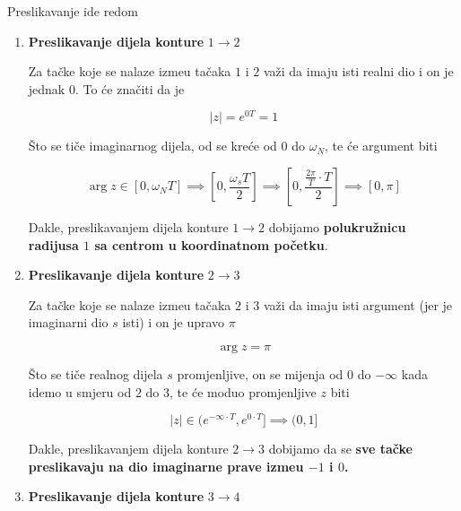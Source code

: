 \documentclass[12pt]{IEEEtran}
\numberwithin{equation}{subsection}
\numberwithin{figure}{section}
\begin{document}
Preslikavanje ide redom

\begin{enumerate}
    \item \textbf{Preslikavanje dijela konture} $1 \to 2$
    
    Za ta\v{c}ke koje se nalaze izme\dj{}u ta\v{c}aka $1$ i $2$ va\v{z}i 
    da imaju isti realni dio i on je jednak $0$. To \'{c}e zna\v{c}iti da je 

    \begin{equation}
        |z| = e^{0T} = 1
    \end{equation}

    \v{S}to se ti\v{c}e imaginarnog dijela, od se kre\'{c}e od $0$ do $\omega_{N}$, 
    te \'{c}e argument biti 

    \begin{equation}
        \arg{z} \in \left[0, \omega_{N}T\right] \implies \left[0, \frac{\omega_{s}T}{2}\right] \implies \left[0, \frac{\frac{2\pi}{T} \cdot T}{2}\right] \implies \left[0, \pi\right]
    \end{equation}

    Dakle, preslikavanjem dijela konture $1 \to 2$ dobijamo \textbf{polukru\v{z}nicu radijusa $1$ sa centrom u koordinatnom po\v{c}etku}.

    \newpage
    \item \textbf{Preslikavanje dijela konture} $2 \to 3$
    
    Za ta\v{c}ke koje se nalaze izme\dj{}u ta\v{c}aka $2$ i $3$ va\v{z}i da imaju 
    isti argument (jer je imaginarni dio $s$ isti) i on je upravo $\pi$

    \begin{equation}
        \arg{z} = \pi
    \end{equation}

    \v{S}to se ti\v{c}e realnog dijela $s$ promjenljive, on se mijenja od 0 do $-\infty$ kada idemo 
    u smjeru od $2$ do $3$, te \'{c}e moduo promjenljive $z$ biti

    \begin{equation}
        |z| \in (e^{-\infty \cdot T}, e^{0 \cdot T}] \implies (0, 1]
    \end{equation}

    Dakle, preslikavanjem dijela konture $2 \to 3$ dobijamo da se \textbf{sve ta\v{c}ke 
    preslikavaju na dio imaginarne prave izme\dj{}u $-1$ i $0$.}

    \item \textbf{Preslikavanje dijela konture} $3 \to 4$
    

\end{enumerate}
\end{document}
